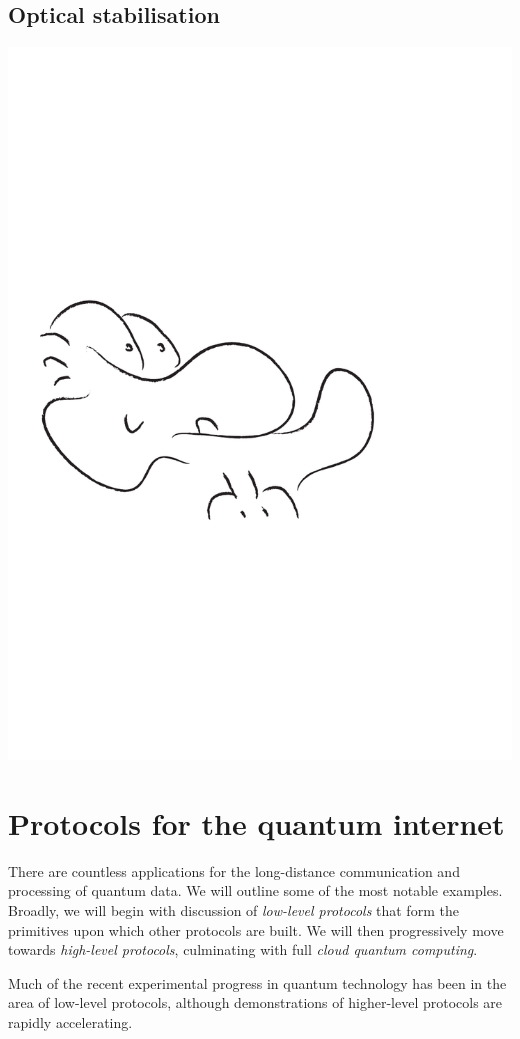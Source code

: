 \documentclass[aps, rmp, twocolumn, amsmath, amssymb, nofootinbib, superscriptaddress, longbibliography, floatfix, table-of-contents, eqsecnum]{revtex4-1}
\newcommand{\comment}[1]{{\color{blue}{\textbf{#1}}}}
\begin{document}
%
%

\subsection{Optical stabilisation} 

\comment{To do!}

\begin{center}
	\includegraphics[width=0.6\columnwidth]{sketch_23}
\end{center}

%
%

\section{Protocols for the quantum internet} \label{sec:protocols_quant_int} 

There are countless applications for the long-distance communication and processing of quantum data. We will outline some of the most notable examples. Broadly, we will begin with discussion of \textit{low-level protocols} that form the primitives upon which other protocols are built. We will then progressively move towards \textit{high-level protocols}, culminating with full \textit{cloud quantum computing}.

Much of the recent experimental progress in quantum technology has been in the area of low-level protocols, although demonstrations of higher-level protocols are rapidly accelerating.
\end{document}
